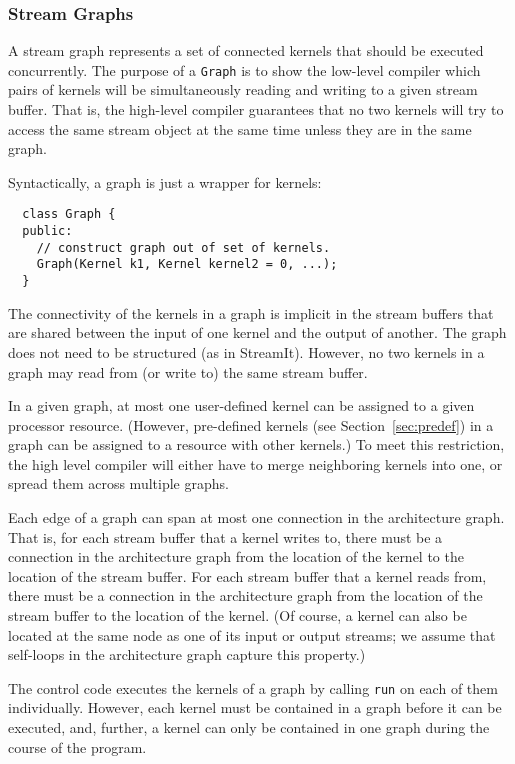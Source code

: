 \subsubsection{Stream Graphs}
\label{sec:streamgraph}

A stream graph represents a set of connected kernels that should be
executed concurrently.  The purpose of a {\tt Graph} is to show the
low-level compiler which pairs of kernels will be simultaneously
reading and writing to a given stream buffer.  That is, the high-level
compiler guarantees that no two kernels will try to access the same
stream object at the same time unless they are in the same graph.

Syntactically, a graph is just a wrapper for kernels:
{\small
\begin{verbatim}
  class Graph {
  public:
    // construct graph out of set of kernels.
    Graph(Kernel k1, Kernel kernel2 = 0, ...);
  }
\end{verbatim}}
\noindent The connectivity of the kernels in a graph is implicit in
the stream buffers that are shared between the input of one kernel and
the output of another.  The graph does not need to be structured (as
in StreamIt).  However, no two kernels in a graph may read from (or
write to) the same stream buffer.

In a given graph, at most one user-defined kernel can be assigned to a
given processor resource.  (However, pre-defined kernels (see
Section~\ref{sec:predef}) in a graph can be assigned to a resource
with other kernels.)  To meet this restriction, the high level
compiler will either have to merge neighboring kernels into one, or
spread them across multiple graphs.

Each edge of a graph can span at most one connection in the
architecture graph.  That is, for each stream buffer that a kernel
writes to, there must be a connection in the architecture graph from
the location of the kernel to the location of the stream buffer.  For
each stream buffer that a kernel reads from, there must be a
connection in the architecture graph from the location of the stream
buffer to the location of the kernel.  (Of course, a kernel can also
be located at the same node as one of its input or output streams; we
assume that self-loops in the architecture graph capture this
property.)


The control code executes the kernels of a graph by calling {\tt run}
on each of them individually.  However, each kernel must be contained
in a graph before it can be executed, and, further, a kernel can only
be contained in one graph during the course of the program.

